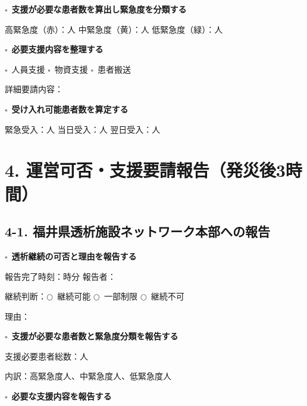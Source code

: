\documentclass[a4paper,12pt]{jarticle}
\newcommand{\checkbox}{$\square$\ }
\newcommand{\underlinespace}[1]{\underline{\hspace{#1}}}
\newcommand{\circlecheck}{$\bigcirc$\ }
\begin{document}
\checkbox \textbf{支援が必要な患者数を算出し緊急度を分類する}

\quad 高緊急度（赤）：\underlinespace{2cm}人 \quad 中緊急度（黄）：\underlinespace{2cm}人 \quad 低緊急度（緑）：\underlinespace{2cm}人

\vspace{4mm}

\checkbox \textbf{必要支援内容を整理する}

\quad \checkbox 人員支援 \quad \checkbox 物資支援 \quad \checkbox 患者搬送

\quad 詳細要請内容：\underlinespace{10cm}

\vspace{4mm}

\checkbox \textbf{受け入れ可能患者数を算定する}

\quad 緊急受入：\underlinespace{2cm}人 \quad 当日受入：\underlinespace{2cm}人 \quad 翌日受入：\underlinespace{2cm}人

\vspace{5mm}

\section*{4. 運営可否・支援要請報告（発災後3時間）}

\subsection*{4-1. 福井県透析施設ネットワーク本部への報告}

\checkbox \textbf{透析継続の可否と理由を報告する}

\quad 報告完了時刻：\underlinespace{1cm}時\underlinespace{1cm}分 \quad 報告者：\underlinespace{4cm}

\quad 継続判断：\circlecheck 継続可能 \circlecheck 一部制限 \circlecheck 継続不可

\quad 理由：\underlinespace{10cm}

\vspace{4mm}

\checkbox \textbf{支援が必要な患者数と緊急度分類を報告する}

\quad 支援必要患者総数：\underlinespace{2cm}人

\quad 内訳：高緊急度\underlinespace{2cm}人、中緊急度\underlinespace{2cm}人、低緊急度\underlinespace{2cm}人

\vspace{4mm}

\checkbox \textbf{必要な支援内容を報告する}
\end{document}
